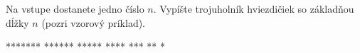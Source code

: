 




Na vstupe dostanete jedno číslo $n$. Vypíšte trojuholník hviezdičiek so základňou dĺžky $n$ (pozri
vzorový príklad).

\vystup
*******
******
*****
****
***
**
*
\koniec


